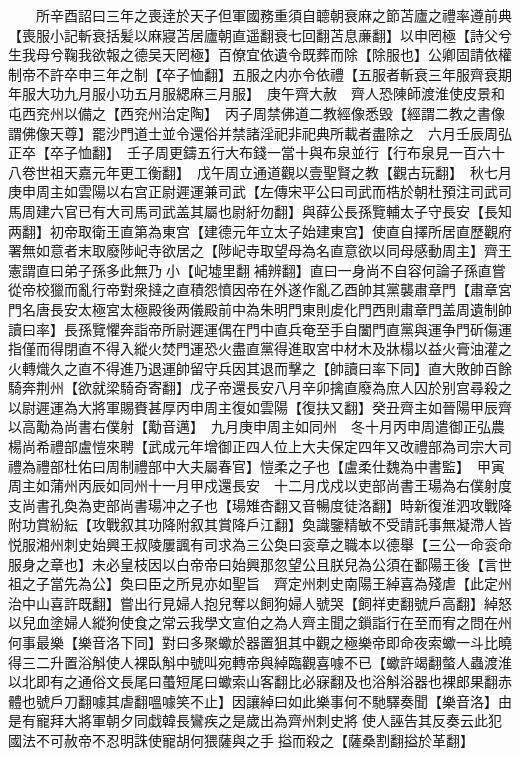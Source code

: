 　　所辛酉詔曰三年之喪逹於天子但軍國務重須自聼朝衰麻之節苫廬之禮率遵前典【喪服小記斬衰括髪以麻寢苫居廬朝直遥翻衰七回翻苫息亷翻】以申罔極【詩父兮生我母兮鞠我欲報之德吴天罔極】百僚宜依遺令既葬而除【除服也】公卿固請依權制帝不許卒申三年之制【卒子恤翻】五服之内亦令依禮【五服者斬衰三年服齊衰期年服大功九月服小功五月服緦麻三月服】　庚午齊大赦　齊人恐陳師渡淮使皮景和屯西兖州以備之【西兖州治定陶】　丙子周禁佛道二教經像悉毁【經謂二教之書像謂佛像天尊】罷沙門道士並令還俗并禁諸淫祀非祀典所載者盡除之　六月壬辰周弘正卒【卒子恤翻】　壬子周更鑄五行大布錢一當十與布泉並行【行布泉見一百六十八卷世祖天嘉元年更工衡翻】　戊午周立通道觀以壹聖賢之教【觀古玩翻】　秋七月庚申周主如雲陽以右宫正尉遲運兼司武【左傳宋平公曰司武而梏於朝杜預注司武司馬周建六官已有大司馬司武盖其屬也尉紆勿翻】與薛公長孫覽輔太子守長安【長知两翻】初帝取衛王直第為東宫【建德元年立太子始建東宫】使直自擇所居直歷觀府署無如意者末取廢陟屺寺欲居之【陟屺寺取望母為名直意欲以同母感動周主】齊王憲謂直曰弟子孫多此無乃小【屺墟里翻補辨翻】直曰一身尚不自容何論子孫直嘗從帝校獵而亂行帝對衆撻之直積怨憤因帝在外遂作亂乙酉帥其黨襲肅章門【肅章宮門名唐長安太極宮太極殿後两儀殿前中為朱明門東則䖍化門西則肅章門盖周遺制帥讀曰率】長孫覽懼奔詣帝所尉遲運偶在門中直兵奄至手自闔門直黨與運争門斫傷運指僅而得閉直不得入縱火焚門運恐火盡直黨得進取宮中材木及牀榻以益火膏油灌之火轉熾久之直不得進乃退運帥留守兵因其退而擊之【帥讀曰率下同】直大敗帥百餘騎奔荆州【欲就梁騎奇寄翻】戊子帝還長安八月辛卯擒直廢為庶人囚於别宫尋殺之以尉遲運為大將軍賜賚甚厚丙申周主復如雲陽【復扶又翻】癸丑齊主如晉陽甲辰齊以高勱為尚書右僕射【勱音邁】　九月庚申周主如同州　冬十月丙申周遣御正弘農楊尚希禮部盧愷來聘【武成元年增御正四人位上大夫保定四年又改禮部為司宗大司禮為禮部杜佑曰周制禮部中大夫屬春官】愷柔之子也【盧柔仕魏為中書監】　甲寅周主如蒲州丙辰如同州十一月甲戍還長安　十二月戊戍以吏部尚書王瑒為右僕射度支尚書孔奐為吏部尚書瑒冲之子也【瑒雉杏翻又音暢度徒洛翻】時新復淮泗攻戰降附功賞紛紜【攻戰叙其功降附叙其賞降戶江翻】奐識鑒精敏不受請託事無凝滯人皆悦服湘州刺史始興王叔陵屢諷有司求為三公奐曰衮章之職本以德舉【三公一命衮命服身之章也】未必皇枝因以白帝帝曰始興那忽望公且朕兒為公須在鄱陽王後【言世祖之子當先為公】奐曰臣之所見亦如聖旨　齊定州刺史南陽王綽喜為殘虐【此定州治中山喜許既翻】嘗出行見婦人抱兒奪以飼狗婦人號哭【飼祥吏翻號戶高翻】綽怒以兒血塗婦人縱狗使食之常云我學文宣伯之為人齊主聞之鎻詣行在至而宥之問在州何事最樂【樂音洛下同】對曰多聚蠍於器置狙其中觀之極樂帝即命夜索蠍一斗比曉得三二升置浴斛使人裸臥斛中號叫宛轉帝與綽臨觀喜噱不已【蠍許竭翻螫人蟲渡淮以北即有之通俗文長尾曰蠆短尾曰蠍索山客翻比必寐翻及也浴斛浴器也裸郎果翻赤體也號戶刀翻噱其虐翻嗢噱笑不止】因讓綽曰如此樂事何不馳驛奏聞【樂音洛】由是有寵拜大將軍朝夕同戱韓長鸞疾之是歲出為齊州刺史將使人誣告其反奏云此犯國法不可赦帝不忍明誅使寵胡何猥薩與之手搤而殺之【薩桑割翻搤於革翻】

